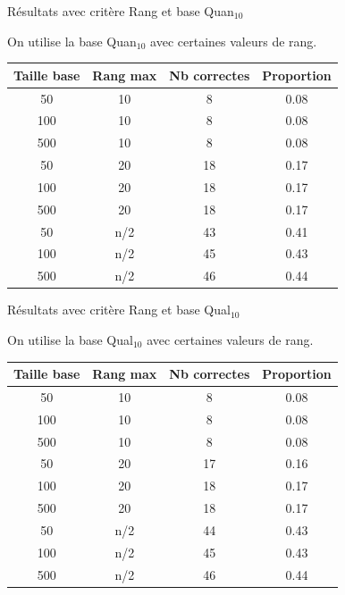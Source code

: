 \documentclass{beamer}
\begin{document}
\begin{frame}{Résultats avec critère Rang et base Quan$_{10}$}

On utilise la base Quan$_{10}$ avec certaines valeurs de rang.
\begin{tabular}{|c|c|c|c|}
   \hline
   Taille base & Rang max & Nb correctes & Proportion\\
   \hline
   50 & 10  & 8 & 0.08  \\
   \hline
   100 & 10  & 8 & 0.08  \\
   \hline
   500 & 10  & 8 & 0.08  \\
   \hline
   \hline
   50 & 20 & 18 & 0.17  \\
   \hline
   100 & 20 & 18 & 0.17  \\
   \hline
   500 & 20 & 18 & 0.17  \\
   \hline
   \hline
   50 & n/2 & 43 & 0.41  \\
   \hline
   100 & n/2 & 45 & 0.43  \\
   \hline
   500 & n/2 & 46 & 0.44  \\
   \hline
\end{tabular}

\end{frame}

\begin{frame}{Résultats avec critère Rang et base Qual$_{10}$}

On utilise la base Qual$_{10}$ avec certaines valeurs de rang.
\begin{tabular}{|c|c|c|c|}
   \hline
   Taille base & Rang max & Nb correctes & Proportion\\
   \hline
   50 & 10  & 8 & 0.08  \\
   \hline
   100 & 10  & 8 & 0.08  \\
   \hline
   500 & 10  & 8 & 0.08  \\
   \hline
   \hline
   50 & 20  & 17 & 0.16  \\
   \hline
   100 & 20 & 18 & 0.17  \\
   \hline
   500 & 20 & 18 & 0.17  \\
   \hline
   \hline
   50 & n/2 & 44 & 0.43  \\
   \hline
   100 & n/2 & 45 & 0.43  \\
   \hline
   500 & n/2 & 46 & 0.44  \\
   \hline
\end{tabular}
\end{frame}
\end{document}
